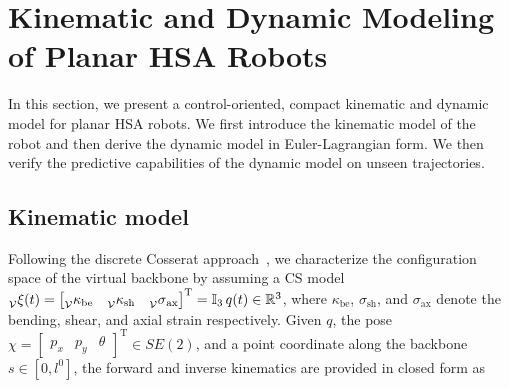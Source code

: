 \section{Kinematic and Dynamic Modeling of Planar HSA Robots}\label{sec:hsamodel:planar_hsa_robot_model}
In this section, we present a control-oriented, compact kinematic and dynamic model for planar \gls{HSA} robots. We first introduce the kinematic model of the robot and then derive the dynamic model in Euler-Lagrangian form. We then verify the predictive capabilities of the dynamic model on unseen trajectories.

\subsection{Kinematic model}\label{sub:hsamodel:planar_hsa_robot_model:kinematics}
Following the discrete Cosserat approach~\cite{renda2018discrete}, we characterize the configuration space of the virtual backbone by assuming a \gls{CS} model
$\prescript{}{\mathcal{V}}{\xi}(t) = \begin{bmatrix}\prescript{}{{\mathcal{V}}}{\kappa}_\mathrm{be} & \prescript{}{{\mathcal{V}}}{\kappa}_\mathrm{sh} & \prescript{}{{\mathcal{V}}}{\sigma}_\mathrm{ax}\end{bmatrix}^\mathrm{T} = \mathbb{I}_3 \, q(t) \in \mathbb{R}^3$, where $\kappa_\mathrm{be}$, $\sigma_\mathrm{sh}$, and $\sigma_\mathrm{ax}$ denote the bending, shear, and axial strain respectively.
Given $q$, the pose $\chi = \begin{bmatrix}
    p_x & p_y & \theta
\end{bmatrix}^\mathrm{T} \in SE(2)$, and a point coordinate along the backbone $s \in [0, l^0]$, the forward and inverse kinematics are provided in closed form as
